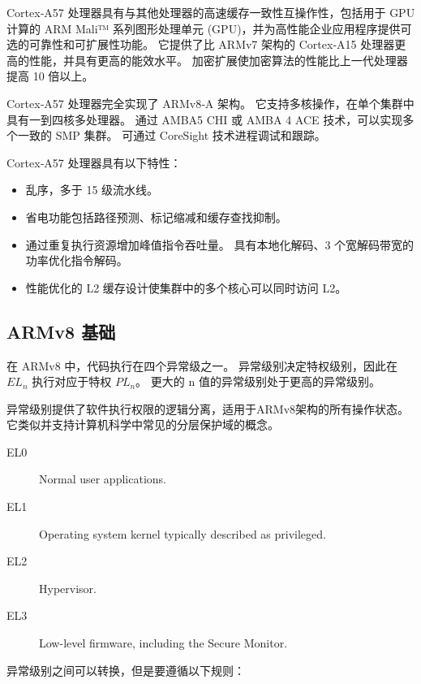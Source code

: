 Cortex‑A57 处理器具有与其他处理器的高速缓存一致性互操作性，包括用于 GPU 计算的 ARM Mali™ 系列图形处理单元 (GPU)，并为高性能企业应用程序提供可选的可靠性和可扩展性功能。
它提供了比 ARMv7 架构的 Cortex‑A15 处理器更高的性能，并具有更高的能效水平。
加密扩展使加密算法的性能比上一代处理器提高 10 倍以上。


Cortex‑A57 处理器完全实现了 ARMv8‑A 架构。
它支持多核操作，在单个集群中具有一到四核多处理器。
通过 AMBA5 CHI 或 AMBA 4 ACE 技术，可以实现多个一致的 SMP 集群。
可通过 CoreSight 技术进程调试和跟踪。

Cortex‑A57 处理器具有以下特性：

\begin{itemize}
  \item 乱序，多于 15 级流水线。
  \item 省电功能包括路径预测、标记缩减和缓存查找抑制。
  \item 通过重复执行资源增加峰值指令吞吐量。
    具有本地化解码、3 个宽解码带宽的功率优化指令解码。
  \item 性能优化的 L2 缓存设计使集群中的多个核心可以同时访问 L2。
\end{itemize}

\subsection{ARMv8 基础}

在 ARMv8 中，代码执行在四个异常级之一。
异常级别决定特权级别，因此在 $EL_n$ 执行对应于特权 $PL_n$。
更大的 n 值的异常级别处于更高的异常级别。

异常级别提供了软件执行权限的逻辑分离，适用于ARMv8架构的所有操作状态。
它类似并支持计算机科学中常见的分层保护域的概念。

\begin{description}
    \item[EL0] Normal user applications.
    \item[EL1] Operating system kernel typically described as privileged.
    \item[EL2] Hypervisor.
    \item[EL3] Low-level firmware, including the Secure Monitor.
\end{description}


异常级别之间可以转换，但是要遵循以下规则：

